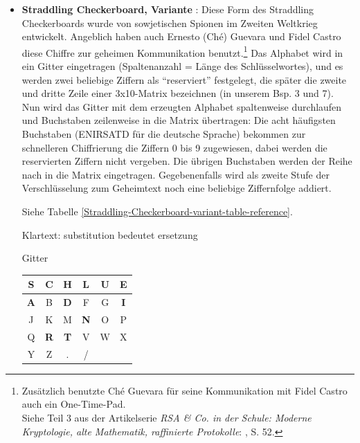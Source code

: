 \begin{refsegment}
\begin{itemize}
\item {\bf Straddling Checkerboard, Variante} \cite{Goebel2014}%
   :
   Diese Form des Straddling Checkerboards wurde von sowjetischen Spionen
   im Zweiten Weltkrieg entwickelt. Angeblich haben auch Ernesto (Ch\'e)
   Guevara und Fidel Castro diese Chiffre zur geheimen
   Kommunikation benutzt.\footnote{%
     Zusätzlich benutzte Ch\'e Guevara für seine Kommunikation mit Fidel Castro
     auch ein One-Time-Pad.\\
     Siehe Teil 3 aus der Artikelserie {\em RSA \& Co. in der Schule:
     Moderne Kryptologie, alte Mathematik, raffinierte Protokolle}:
     \cite{Witten1999}, S. 52.
   }
   Das Alphabet wird in ein Gitter eingetragen (Spaltenanzahl = Länge des
   Schlüsselwortes), und es werden zwei beliebige Ziffern als "`reserviert"'
   festgelegt, die später die zweite und dritte Zeile einer
   3x10-Matrix bezeichnen (in unserem Bsp. 3 und 7). Nun wird das Gitter mit
   dem erzeugten Alphabet spaltenweise durchlaufen und Buchstaben zeilenweise
   in die Matrix übertragen:
   Die acht häufigsten Buchstaben (ENIRSATD für die deutsche Sprache)
   bekommen zur schnelleren Chiffrierung die Ziffern 0 bis 9 zugewiesen,
   dabei werden die reservierten Ziffern nicht vergeben. Die übrigen
   Buchstaben werden der Reihe nach in die Matrix eingetragen.
   Gegebenenfalls wird als zweite Stufe der Verschlüsselung zum Geheimtext
   noch eine beliebige Ziffernfolge addiert.

   Siehe Tabelle \ref{Straddling-Checkerboard-variant-table-reference}.

   Klartext: substitution bedeutet ersetzung

   \begin{table}[ht]

   \begin{center}
   Gitter~~
   \begin{tabular}{|c|c|c|c|c|c|}
   \hline 		
	{\bf S} & C & H & L & U & {\bf E}\\
   \hline
	{\bf A} & B & {\bf D} & F & G & {\bf I}\\
   \hline
	J & K & M & {\bf N} & O & P\\
   \hline
	Q & {\bf R} & {\bf T} & V & W & X\\
   \hline
	Y & Z & . & / &   &    \\
   \hline
   \end{tabular}
   \end{center}


\end{table}
\end{itemize}
\end{refsegment}
